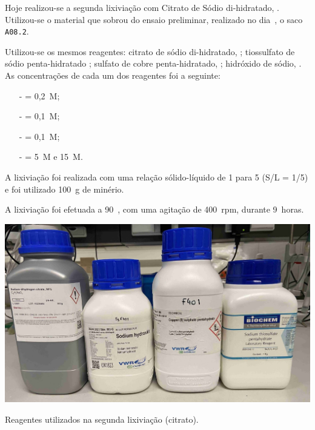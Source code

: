 \hrulefill


Hoje realizou-se a segunda lixiviação com Citrato de Sódio di-hidratado, \citratodi{}. Utilizou-se o material que sobrou do ensaio preliminar, realizado no dia~, o saco \texttt{A08.2}.

Utilizou-se os mesmos reagentes: citrato de sódio di-hidratado, \citratodi{}; tiossulfato de sódio penta-hidratado \tsp{}; sulfato de cobre penta-hidratado, \sulfcu{}; hidróxido de sódio, \hidso{}.
As concentrações de cada um dos reagentes foi a seguinte:

\begin{itemize}
    \item[-] \citratodi{} = 0,2~M;
    \item[-] \tsp{} = 0,1~M;
    \item[-] \sulfcu{} = 0,1~M;
    \item[-] \hidso{} = 5~M e 15~M.
\end{itemize}

A lixiviação foi realizada com uma relação sólido-líquido de 1 para 5 (S/L = 1/5) e foi utilizado 100~g de minério.

A lixiviação foi efetuada a 90~\graus{}, com uma agitação de 400~rpm, durante 9~horas.

\begin{marginfigure}
    \centering
    \includegraphics[width=0.9\linewidth]{figures/reagentes lixiviação citrato}
    \caption{Reagentes utilizados na segunda lixiviação (citrato).}
    \label{fig:reagentes-lix-citrato2}
\end{marginfigure}

